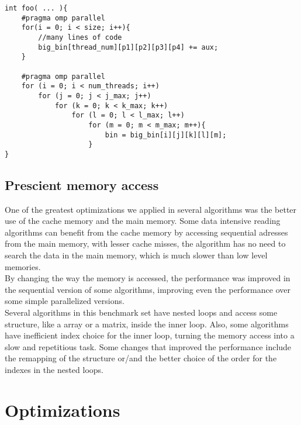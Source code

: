 \documentclass[10pt,a4paper]{report}
\begin{document}
\begin{description}
\begin{description}
\begin{lstlisting}[caption=4-dimensional accumulation,style=base]
int foo( ... ){
	#pragma omp parallel
	for(i = 0; i < size; i++){
		//many lines of code
		big_bin[thread_num][p1][p2][p3][p4] += aux;
	}
	
	#pragma omp parallel
	for (i = 0; i < num_threads; i++)
		for (j = 0; j < j_max; j++)
			for (k = 0; k < k_max; k++)
				for (l = 0; l < l_max; l++)
					for	(m = 0; m < m_max; m++){
						bin = big_bin[i][j][k][l][m];
					}
}
\end{lstlisting}	 
	     	   
\end{description}
\end{description}
\section{Prescient memory access}
One of the greatest optimizations we applied in several algorithms was the better use of the cache memory and the main memory. Some data intensive reading algorithms can benefit from the cache memory by accessing sequential adresses from the main memory, with lesser cache misses, the algorithm has no need to search the data in the main memory, which is much slower than low level memories. \\

By changing the way the memory is accessed, the performance was improved in the sequential version of some algorithms, improving even the performance over some simple parallelized versions.\\

Several algorithms in this benchmark set have nested loops and access some structure, like a array or a matrix, inside the inner loop. Also, some algorithms have inefficient index choice for the inner loop, turning the memory access into a slow and repetitious task. Some changes that improved the performance include the remapping of the structure or/and the better choice of the order for the indexes in the nested loops. \\


\chapter{Optimizations}

\newpage
\end{document}
